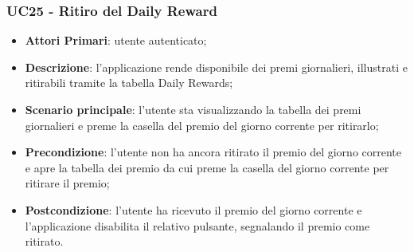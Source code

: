 \subsubsection{UC25 - Ritiro del Daily Reward}
\begin{itemize}
	\item \textbf{Attori Primari}: utente autenticato;
	\item \textbf{Descrizione}: l'applicazione rende disponibile dei premi giornalieri, illustrati e ritirabili tramite la tabella Daily Rewards;
	\item \textbf{Scenario principale}: l'utente sta visualizzando la tabella dei premi giornalieri e preme la casella del premio del giorno corrente per ritirarlo;
	\item \textbf{Precondizione}: l'utente non ha ancora ritirato il premio del giorno corrente e apre la tabella dei premio da cui preme la casella del giorno corrente per ritirare il premio;
	\item \textbf{Postcondizione}: l'utente ha ricevuto il premio del giorno corrente e l'applicazione disabilita il relativo pulsante, segnalando il premio come ritirato. 
\end{itemize} 